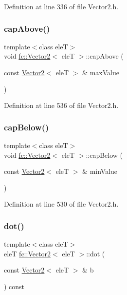 Definition at line 336 of file Vector2.\+h.

\mbox{\label{classfc_1_1Vector2_a62c8f4a3f1909857834e5cc9e8342574}} 
\subsubsection{\texorpdfstring{cap\+Above()}{capAbove()}}
{\footnotesize\ttfamily template$<$class eleT$>$ \\
void \hyperlink{classfc_1_1Vector2}{fc\+::\+Vector2}$<$ eleT $>$\+::cap\+Above (\begin{DoxyParamCaption}\item[{const \hyperlink{classfc_1_1Vector2}{Vector2}$<$ eleT $>$ \&}]{max\+Value }\end{DoxyParamCaption})}



Definition at line 536 of file Vector2.\+h.

\mbox{\label{classfc_1_1Vector2_a045f037481473f7cd9abe09f8b552021}} 
\subsubsection{\texorpdfstring{cap\+Below()}{capBelow()}}
{\footnotesize\ttfamily template$<$class eleT$>$ \\
void \hyperlink{classfc_1_1Vector2}{fc\+::\+Vector2}$<$ eleT $>$\+::cap\+Below (\begin{DoxyParamCaption}\item[{const \hyperlink{classfc_1_1Vector2}{Vector2}$<$ eleT $>$ \&}]{min\+Value }\end{DoxyParamCaption})}



Definition at line 530 of file Vector2.\+h.

\mbox{\label{classfc_1_1Vector2_a05169b39e6b1daa7a5a996fe8aec5f29}} 
\subsubsection{\texorpdfstring{dot()}{dot()}}
{\footnotesize\ttfamily template$<$class eleT$>$ \\
eleT \hyperlink{classfc_1_1Vector2}{fc\+::\+Vector2}$<$ eleT $>$\+::dot (\begin{DoxyParamCaption}\item[{const \hyperlink{classfc_1_1Vector2}{Vector2}$<$ eleT $>$ \&}]{b }\end{DoxyParamCaption}) const}



